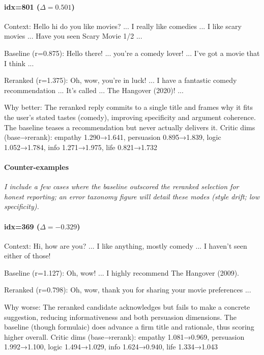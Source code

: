 \documentclass[12pt]{article}
\begin{document}
  \paragraph{idx=801 ($\Delta=0.501$)}
  \begin{center}
  \begin{qexample}
  Context: Hello hi do you like movies? ... I really like comedies ... I like scary movies ... Have you seen Scary Movie 1/2 ...

  Baseline (r=0.875): Hello there! ... you're a comedy lover! ... I've got a movie that I think ...

  Reranked (r=1.375): Oh, wow, you're in luck! ... I have a fantastic comedy recommendation ... It's called ... The Hangover (2020)! ...
  \end{qexample}
  \end{center}
  Why better: The reranked reply commits to a single title and frames why it fits the user's stated tastes (comedy), improving specificity and argument coherence. The baseline teases a recommendation but never actually delivers it.
  Critic dims (base→rerank): empathy 1.290→1.641, persuasion 0.895→1.839, logic 1.052→1.784, info 1.271→1.975, life 0.821→1.732
  
  \paragraph{Counter-examples}
  \textit{I include a few cases where the baseline outscored the reranked selection for honest reporting; an error taxonomy figure will detail these modes (style drift; low specificity).}
  
  \paragraph{idx=369 ($\Delta=-0.329$)}
  \begin{center}
  \begin{qexample}
  Context: Hi, how are you? ... I like anything, mostly comedy ... I haven't seen either of those!
  
  Baseline (r=1.127): Oh, wow! ... I highly recommend The Hangover (2009).
  
  Reranked (r=0.798): Oh, wow, thank you for sharing your movie preferences ...
  \end{qexample}
  \end{center}
  Why worse: The reranked candidate acknowledges but fails to make a concrete suggestion, reducing informativeness and both persuasion dimensions. The baseline (though formulaic) does advance a firm title and rationale, thus scoring higher overall.
  Critic dims (base→rerank): empathy 1.081→0.969, persuasion 1.992→1.100, logic 1.494→1.029, info 1.624→0.940, life 1.334→1.043
  
\end{document}

